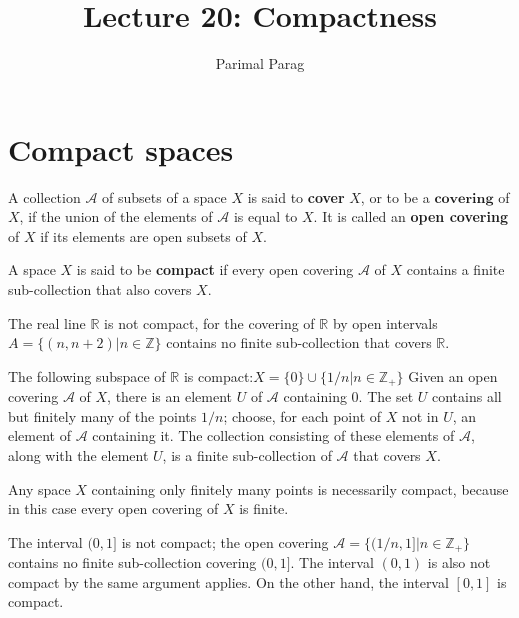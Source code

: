\documentclass[a4paper,english,12pt]{article}
\title{Lecture 20: Compactness}
\author{Parimal Parag}
\begin{document}
\maketitle

\section{Compact spaces}
\begin{defn}
	A collection $\mathcal{A}$ of subsets of a space $X$ is said to \textbf{cover} $X$, or to be a $\textbf{covering}$ of $X$, if the union of the elements of $\mathcal{A}$ is equal to $X$. It is called an \textbf{open covering} of $X$ if its elements are open subsets of $X$.
\end{defn}
	
\begin{defn}	
	A space $X$ is said to be \textbf{compact} if every open covering $\mathcal{A}$ of $X$ contains a finite sub-collection that also covers $X$.
\end{defn}	

\begin{exmp}
	The real line $\mathbb{R}$ is not compact, for the covering of $\mathbb{R}$ by open intervals $A = \{(n,n+2) | n \in \mathbb{Z}\}$
	contains no finite sub-collection that covers $\mathbb{R}$.
\end{exmp}

\begin{exmp}
	The following subspace of $\mathbb{R}$ is compact:$ X= \{0\} \cup \{1/n | n \in \mathbb{Z_+}\} $
	Given an open covering $\mathcal{A}$ of $X$, there is an element $U$ of $\mathcal{A}$ containing $0$. The set $U$ contains all but finitely many of the points $1/n$; choose, for each point of $X$ not in $U$, an element of $\mathcal{A}$ containing it. The collection consisting of these elements of $\mathcal{A}$, along with the element $U$, is a finite sub-collection of $\mathcal{A}$ that covers $X$.
\end{exmp}

\begin{exmp}
	Any space $X$ containing only finitely many points is necessarily compact, because in this case every open covering of $X$ is finite.
\end{exmp}

\begin{exmp}
	The interval $(0,1]$ is not compact; the open covering
	$	\mathcal{A} = \{(1/n,1] | n \in \mathbb{Z_+}\}  $
	contains no finite sub-collection covering $(0, 1]$. The interval $(0, 1)$ is also not compact by the same argument applies. On the other hand, the interval $[0, 1]$ is compact.
\end{exmp}
\end{document}
